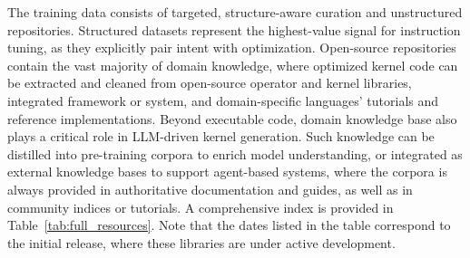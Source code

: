 The training data consists of targeted, structure-aware curation and unstructured repositories. Structured datasets represent the highest-value signal for instruction tuning, as they explicitly pair intent with optimization. Open-source repositories contain the vast majority of domain knowledge, where optimized kernel code can be extracted and cleaned from open-source operator and kernel libraries, integrated framework or system, and domain-specific languages' tutorials and reference implementations. Beyond executable code, domain knowledge base also plays a critical role in LLM-driven kernel generation. Such knowledge can be distilled into pre-training corpora to enrich model understanding, or integrated as external knowledge bases to support agent-based systems, where the corpora is always provided in authoritative documentation and guides, as well as in community indices or tutorials. A comprehensive index is provided in Table~\ref{tab:full_resources}. Note that the dates listed in the table correspond to the initial release, where these libraries are under active development. 